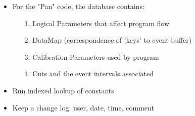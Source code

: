 \begin{slide*}

\centerline{}
{\Large 
\begin{itemize}
\item  For the "Pan" code, the database contains:

\begin{itemize}
     \item[1.] Logical Parameters that affect program flow
     \item[2.] DataMap (correspondence of 'keys' to event buffer)
     \item[3.] Calibration Parameters used by program
     \item[4.] Cuts and the event intervals associated
\end{itemize}

\item Run indexed lookup of constants

\item Keep a change log: user, date, time, comment

\end{itemize}
}

\end{slide*}



